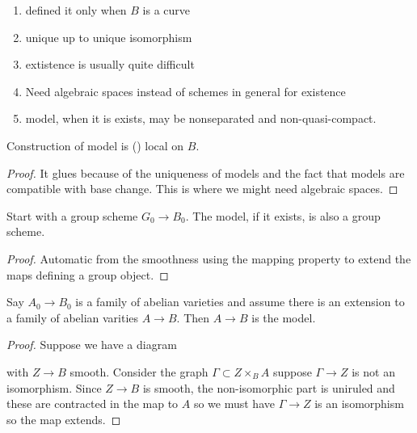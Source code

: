 \documentclass[12pt]{article}
\begin{document}
\begin{rmk}
\begin{enumerate}
\item \Neron defined it only when $B$ is a curve
\item unique up to unique isomorphism
\item extistence is usually quite difficult 
\item Need algebraic spaces instead of schemes in general for existence
\item \Neron model, when it is exists, may be nonseparated and non-quasi-compact.
\end{enumerate}
\end{rmk}

\begin{prop}
Construction of \Neron model is (\etale) local on $B$.
\end{prop}

\begin{proof}
It glues because of the uniqueness of \Neron models and the fact that \Neron models are compatible with \etale base change. This is where we might need algebraic spaces.
\end{proof}

\begin{prop}
Start with a group scheme $G_0 \to B_0$. The \Neron model, if it exists, is also a group scheme.
\end{prop}

\begin{proof}
Automatic from the smoothness using the \Neron mapping property to extend the maps defining a group object.
\end{proof}

\begin{example}
Say $A_0 \to B_0$ is a family of abelian varieties and assume there is an extension to a family of abelian varities $A \to B$. Then $A \to B$ is the \Neron model.
\end{example}

\begin{proof}
Suppose we have a diagram
\begin{center}
\end{center}
with $Z \to B$ smooth. Consider the graph $\Gamma \subset Z \times_B A$ suppose $\Gamma \to Z$ is not an isomorphism. Since $Z \to B$ is smooth, the non-isomorphic part is uniruled and these are contracted in the map to $A$ so we must have $\Gamma \to Z$ is an isomorphism so the map extends. 
\end{proof}
\end{document}
